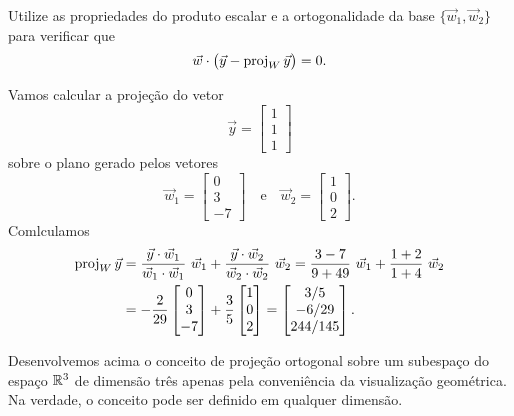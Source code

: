 \documentclass[../livro.tex]{subfiles}  %
\begin{document}
\begin{exercise}
Utilize as propriedades do produto escalar e a ortogonalidade da base $\{\vec{w}_1, \vec{w}_2\}$ para verificar que
\[
\vec{w} \cdot  \big( \vec{y} - \operatorname{proj}_W \vec{y} \big) = 0.
\]
\end{exercise}

\begin{example}
Vamos calcular a projeção do vetor
\[
\vec{y} =
\begin{bmatrix}
 1\\1\\1
\end{bmatrix}
\] sobre o plano gerado pelos vetores
\[
\vec{w}_1 =
\begin{bmatrix}
 0\\3\\-7
\end{bmatrix} \quad \text{e} \quad
\vec{w}_2 =
\begin{bmatrix}
 1\\0\\2
\end{bmatrix}.
\] Comlculamos
\[
\begin{split}
\operatorname{proj}_W \vec{y} & = \frac{\vec{y} \cdot \vec{w}_1}{\vec{w}_1 \cdot \vec{w}_1} \ \vec{w}_1 + \frac{\vec{y} \cdot \vec{w}_2}{\vec{w}_2 \cdot \vec{w}_2} \ \vec{w}_2 = \frac{3-7}{9 + 49} \ \vec{w}_1 + \frac{1 + 2}{1+4} \ \vec{w}_2 \\
                & = -\frac{2}{29}
                \begin{bmatrix}
 0\\3\\-7
\end{bmatrix}
                + \frac{3}{5}
\begin{bmatrix}
 1\\0\\2
\end{bmatrix} =
\begin{bmatrix}
 3/5 \\ -6/29 \\ 244/145
\end{bmatrix}.
\end{split}
\]
\end{example}


Desenvolvemos acima o conceito de projeção ortogonal sobre um subespaço do espaço $\mathbb{R}^3$ de dimensão três apenas pela conveniência da visualização geométrica. Na verdade, o conceito pode ser definido em qualquer dimensão.
\end{document}
